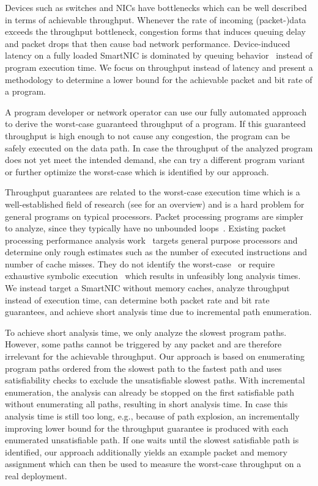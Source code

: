 \documentclass[10pt,letterpaper,sigconf,anonymous,nonacm,screen]{acmart}
\newcommand{\eg}{e.g.,}
\begin{document}
Devices such as switches and NICs have bottlenecks which can be well described in terms of achievable throughput.
Whenever the rate of incoming (packet-)data exceeds the throughput bottleneck, congestion forms that induces queuing delay and packet drops that then cause bad network performance.
Device-induced latency on a fully loaded SmartNIC is dominated by queuing behavior~\cite{xdp-performance,iPipe} instead of program execution time.
We focus on throughput instead of latency and present a methodology to determine a lower bound for the achievable packet and bit rate of a program.

A program developer or network operator can use our fully automated approach to derive the worst-case guaranteed throughput of a program.
If this guaranteed throughput is high enough to not cause any congestion, the program can be safely executed on the data path.
In case the throughput of the analyzed program does not yet meet the intended demand, she can try a different program variant or further optimize the worst-case which is identified by our approach.

Throughput guarantees are related to the worst-case execution time which is a well-established field of research (see \cite{wcet} for an overview) and is a hard problem for general programs on typical processors.
Packet processing programs are simpler to analyze, since they typically have no unbounded loops~\cite{BOLT,gauntlet,lemur}.
Existing packet processing performance analysis work~\cite{BOLT,castan} targets general purpose processors and determine only rough estimates such as the number of executed instructions and number of cache misses.
They do not identify the worst-case~\cite{castan} or require exhaustive symbolic execution~\cite{BOLT} which results in unfeasibly long analysis times.
We instead target a SmartNIC without memory caches, analyze throughput instead of execution time, can determine both packet rate and bit rate guarantees, and achieve short analysis time due to incremental path enumeration.

To achieve short analysis time, we only analyze the slowest program paths.
However, some paths cannot be triggered by any packet and are therefore irrelevant for the achievable throughput.
Our approach is based on enumerating program paths ordered from the slowest path to the fastest path and uses satisfiability checks to exclude the unsatisfiable slowest paths.
With incremental enumeration, the analysis can already be stopped on the first satisfiable path without enumerating all paths, resulting in short analysis time.
In case this analysis time is still too long, \eg{} because of path explosion, an incrementally improving lower bound for the throughput guarantee is produced with each enumerated unsatisfiable path.
If one waits until the slowest satisfiable path is identified, our approach additionally yields an example packet and memory assignment which can then be used to measure the worst-case throughput on a real deployment.
\end{document}
